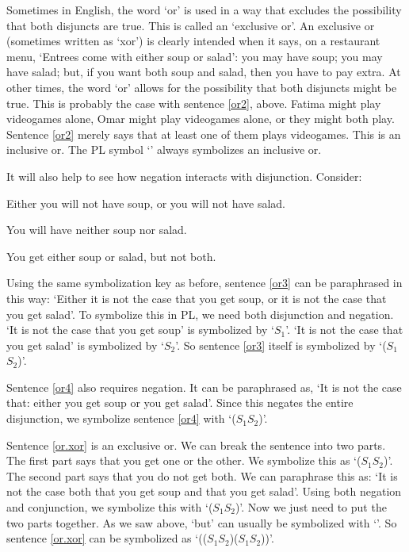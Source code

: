 
Sometimes in English, the word ‘or’ is used in a way that excludes the possibility that both disjuncts are true. This is called an `exclusive or'. An exclusive or (sometimes written as `xor') is clearly intended when it says, on a restaurant menu, ‘Entrees come with either soup or salad’: you may have soup; you may have salad; but, if you want both soup and salad, then you have to pay extra.
At other times, the word ‘or’ allows for the possibility that both disjuncts might be true. This is probably the case with sentence \ref{or2}, above. Fatima might play videogames alone, Omar might play videogames alone, or they might both play. Sentence \ref{or2} merely says that at least one of them plays videogames. This is an inclusive or. The PL symbol ‘\eor’ always symbolizes an inclusive or.

It will also help to see how negation interacts with disjunction. Consider:
	\begin{earg}
		\item[\ex{or3}] Either you will not have soup, or you will not have salad.
		\item[\ex{or4}] You will have neither soup nor salad.
		\item[\ex{or.xor}] You get either soup or salad, but not both.
	\end{earg}

Using the same symbolization key as before, sentence \ref{or3} can be paraphrased in this way: ‘Either it is not the case that you get soup, or it is not the case that you get salad’. To symbolize this in PL, we need both disjunction and negation. ‘It is not the case that you get soup’ is symbolized by ‘\enot $S_1$’. ‘It is not the case that you get salad’ is symbolized by ‘\enot $S_2$’. So sentence \ref{or3} itself is symbolized by ‘(\enot $S_1$\eor \enot $S_2$)’.

Sentence \ref{or4} also requires negation. It can be paraphrased as, ‘It is not the case that: either you get soup or you get salad’. Since this negates the entire disjunction, we symbolize sentence \ref{or4} with ‘\enot ($S_1$\eor $S_2$)’.

Sentence \ref{or.xor} is an exclusive or. We can break the sentence into two parts. The first part says that you get one or the other. We symbolize this as ‘($S_1$\eor $S_2$)’. The second part says that you do not get both. We can paraphrase this as: ‘It is not the case both that you get soup and that you get salad’. Using both negation and conjunction, we symbolize this with ‘\enot ($S_1$\eand $S_2$)’. Now we just need to put the two parts together. As we saw above, ‘but’ can usually be symbolized with ‘\eand’. So sentence \ref{or.xor} can be symbolized as ‘(($S_1$\eor $S_2$)\eand \enot ($S_1$\eand $S_2$))’.

